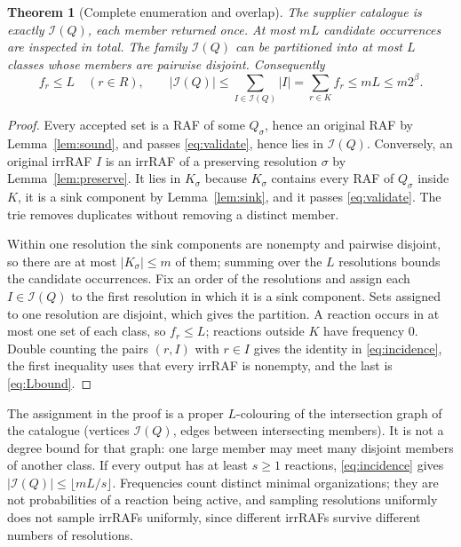 \documentclass[11pt,a4paper]{article}
\theoremstyle{plain}
\newtheorem{theorem}{Theorem}[section]
\theoremstyle{definition}
\theoremstyle{remark}
\newcommand{\Irr}{\mathcal I}
\begin{document}
\begin{theorem}[Complete enumeration and overlap]\label{thm:main}
The supplier catalogue is exactly $\Irr(Q)$, each member returned once. At most $mL$ candidate occurrences are inspected in total. The family $\Irr(Q)$ can be partitioned into at most $L$ classes whose members are pairwise disjoint. Consequently
\begin{equation}\label{eq:incidence}
 f_r\le L\quad(r\in R),\qquad
 |\Irr(Q)|\le\sum_{I\in\Irr(Q)}|I|=\sum_{r\in K}f_r\le mL\le m2^{\beta}.
\end{equation}
\end{theorem}
\begin{proof}
Every accepted set is a RAF of some $Q_\sigma$, hence an original RAF by Lemma~\ref{lem:sound}, and passes \eqref{eq:validate}, hence lies in $\Irr(Q)$. Conversely, an original irrRAF $I$ is an irrRAF of a preserving resolution $\sigma$ by Lemma~\ref{lem:preserve}. It lies in $K_\sigma$ because $K_\sigma$ contains every RAF of $Q_\sigma$ inside $K$, it is a sink component by Lemma~\ref{lem:sink}, and it passes \eqref{eq:validate}. The trie removes duplicates without removing a distinct member.

Within one resolution the sink components are nonempty and pairwise disjoint, so there are at most $|K_\sigma|\le m$ of them; summing over the $L$ resolutions bounds the candidate occurrences. Fix an order of the resolutions and assign each $I\in\Irr(Q)$ to the first resolution in which it is a sink component. Sets assigned to one resolution are disjoint, which gives the partition. A reaction occurs in at most one set of each class, so $f_r\le L$; reactions outside $K$ have frequency $0$. Double counting the pairs $(r,I)$ with $r\in I$ gives the identity in \eqref{eq:incidence}, the first inequality uses that every irrRAF is nonempty, and the last is \eqref{eq:Lbound}.
\end{proof}

The assignment in the proof is a proper $L$-colouring of the intersection graph of the catalogue (vertices $\Irr(Q)$, edges between intersecting members). It is not a degree bound for that graph: one large member may meet many disjoint members of another class. If every output has at least $s\ge1$ reactions, \eqref{eq:incidence} gives $|\Irr(Q)|\le\lfloor mL/s\rfloor$. Frequencies count distinct minimal organizations; they are not probabilities of a reaction being active, and sampling resolutions uniformly does not sample irrRAFs uniformly, since different irrRAFs survive different numbers of resolutions.
\end{document}
